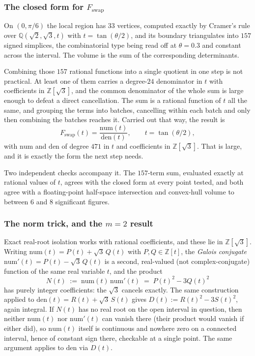 \documentclass[11pt,reqno]{amsart}
\renewcommand{\_}{\origunderscore\allowbreak}
\numberwithin{equation}{section}
\theoremstyle{plain}
\theoremstyle{definition}
\theoremstyle{remark}
\begin{document}
\subsubsection{The closed form for \texorpdfstring{$F_{\mathrm{swap}}$}{F swap}}\label{sec:swap-obstacle}

On $(0,\pi/6)$ the local region has $33$ vertices, computed exactly by
Cramer's rule over $\mathbb{Q}(\sqrt2,\sqrt3,t)$ with
$t=\tan(\theta/2)$, and its boundary triangulates into $157$ signed
simplices, the combinatorial type being read off at $\theta=0.3$ and
constant across the interval. The volume is the sum of the
corresponding determinants.

Combining those $157$ rational functions into a single quotient in one
step is not practical. At least one of them carries a degree-$24$
denominator in $t$ with coefficients in $\mathbb{Z}[\sqrt3]$, and the
common denominator of the whole sum is large enough to defeat a direct
cancellation. The sum is a rational function of $t$ all the same, and
grouping the terms into batches, cancelling within each batch and only
then combining the batches reaches it. Carried out that way, the result is
\[
  F_{\mathrm{swap}}(t) = \frac{\mathrm{num}(t)}{\mathrm{den}(t)}, \qquad
  t=\tan(\theta/2),
\]
with $\mathrm{num}$ and $\mathrm{den}$ of degree $471$ in $t$ and
coefficients in $\mathbb{Z}[\sqrt3]$. That is large, and it is exactly
the form the next step needs.

Two independent checks accompany it. The $157$-term sum, evaluated
exactly at rational values of $t$, agrees with the closed form at every
point tested, and both agree with a floating-point half-space
intersection and convex-hull volume to between $6$ and $8$ significant
figures.

\subsubsection{The norm trick, and the \texorpdfstring{$m=2$}{m=2} result}\label{sec:swap-norm-trick}

Exact real-root isolation works with rational coefficients, and these
lie in $\mathbb{Z}[\sqrt3]$. Writing $\mathrm{num}(t)=P(t)+\sqrt3\,Q(t)$
with $P,Q\in\mathbb{Z}[t]$, the \emph{Galois conjugate}
$\mathrm{num}'(t)=P(t)-\sqrt3\,Q(t)$ is a second,
real-valued (not complex-conjugate) function of the same real variable
$t$, and the product
\[
  N(t) \;:=\; \mathrm{num}(t)\,\mathrm{num}'(t) \;=\; P(t)^2-3Q(t)^2
\]
has purely integer coefficients: the $\sqrt3$ cancels exactly. The same
construction applied to $\mathrm{den}(t)=R(t)+\sqrt3\,S(t)$ gives
$D(t):=R(t)^2-3S(t)^2$, again integral. If $N(t)$ has no real root on
the open interval in question, then neither $\mathrm{num}(t)$ nor
$\mathrm{num}'(t)$ can vanish there (their product would vanish if
either did), so $\mathrm{num}(t)$ itself is continuous and nowhere zero
on a connected interval, hence of constant sign there, checkable at a
single point. The same argument applies to $\mathrm{den}$ via $D(t)$.
\end{document}
